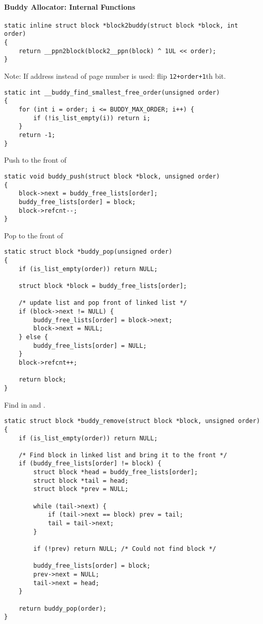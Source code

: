 \paragraph{Buddy Allocator: Internal Functions}
\begin{lstlisting}[style=bright_C++]
static inline struct block *block2buddy(struct block *block, int order)
{
    return __ppn2block(block2__ppn(block) ^ 1UL << order);
}
\end{lstlisting}
Note: If address instead of page number is used: flip \texttt{12+order+1}th bit.

\newpar{}
\begin{lstlisting}[style=bright_C++]
static int __buddy_find_smallest_free_order(unsigned order)
{
    for (int i = order; i <= BUDDY_MAX_ORDER; i++) {
        if (!is_list_empty(i)) return i;
    }
    return -1;
}
\end{lstlisting}

\newpar{}

Push to the front of 
\begin{lstlisting}[style=bright_C++]
static void buddy_push(struct block *block, unsigned order)
{
	block->next = buddy_free_lists[order];
	buddy_free_lists[order] = block;
	block->refcnt--;
}
\end{lstlisting}

\newpar{}

Pop to the front of 
\begin{lstlisting}[style=bright_C++]
static struct block *buddy_pop(unsigned order)
{
    if (is_list_empty(order)) return NULL;

    struct block *block = buddy_free_lists[order];

    /* update list and pop front of linked list */
	if (block->next != NULL) {
		buddy_free_lists[order] = block->next;
		block->next = NULL;
	} else {
		buddy_free_lists[order] = NULL;
	}
	block->refcnt++;

    return block;
}
\end{lstlisting}

\newpar{}

Find  in   and .
\begin{lstlisting}[style=bright_C++]
static struct block *buddy_remove(struct block *block, unsigned order)
{
	if (is_list_empty(order)) return NULL;

	/* Find block in linked list and bring it to the front */
	if (buddy_free_lists[order] != block) {
		struct block *head = buddy_free_lists[order];
		struct block *tail = head;
		struct block *prev = NULL;

		while (tail->next) {
			if (tail->next == block) prev = tail;
			tail = tail->next;
		}

		if (!prev) return NULL; /* Could not find block */

		buddy_free_lists[order] = block;
		prev->next = NULL;
		tail->next = head;
	}

	return buddy_pop(order);
}
\end{lstlisting}

